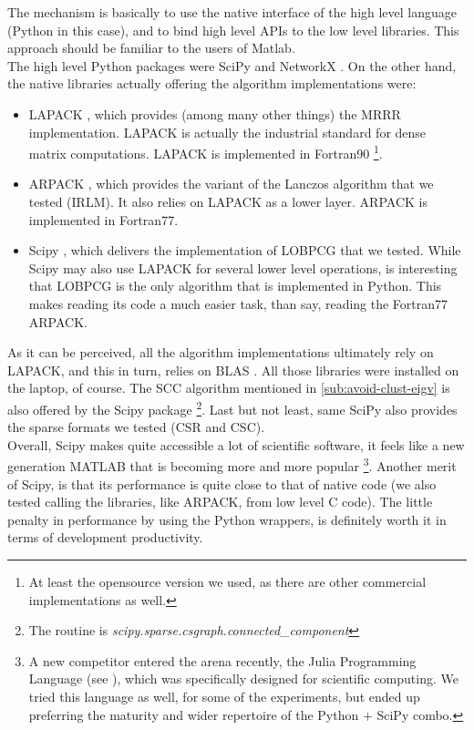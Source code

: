 The mechanism is basically to use the native interface of the high
level language (Python in this case), and to bind high level APIs to
the low level libraries. This approach should be familiar to the users
of Matlab. \\

The high level Python packages were SciPy \cite{scipy} and NetworkX
\cite{networkx}. On the other hand, the 
native libraries actually offering the algorithm implementations were:

\begin{itemize}
  \item LAPACK \cite{lapack}, which provides (among many other things)
    the \gls{MRRR} implementation. LAPACK is actually the industrial
    standard for dense matrix computations. LAPACK is implemented in
    Fortran90 \footnote{At least the opensource version we used, as
      there are other commercial implementations as well.}.

  \item ARPACK \cite{arpack}, which provides the variant of the
    Lanczos algorithm that we tested (\gls{IRLM}). It also relies on LAPACK
    as a lower layer. ARPACK is implemented in Fortran77.

  \item Scipy \cite{scipy}, which delivers the implementation of
    \gls{LOBPCG} that we tested. While Scipy may also use LAPACK for several
    lower level operations, is interesting that \gls{LOBPCG} is the only
    algorithm that is implemented in Python. This makes reading its
    code a much easier task, than say, reading the Fortran77 ARPACK. 
\end{itemize}

As it can be perceived, all the algorithm implementations ultimately
rely on LAPACK, and this in turn, relies on BLAS \cite{blas}. All
those libraries were installed on the laptop, of course. The
\gls{SCC} algorithm mentioned in \cref{sub:avoid-clust-eigv} is
also offered by the Scipy package 
\footnote{The routine is
  \emph{scipy.sparse.csgraph.connected\_component}}. Last but not 
least, same SciPy also provides the sparse formats we tested (CSR and CSC). \\

Overall, Scipy makes quite accessible a lot of scientific
software, it feels like a new generation MATLAB that is becoming more
and more popular \footnote{A new competitor entered the arena
  recently, the Julia Programming Language (see \cite{julia}), which
  was specifically
  designed for scientific computing. We tried this language as well,
  for some of the experiments, but ended up preferring the maturity
  and wider repertoire of the Python + SciPy combo.}. Another merit of Scipy,
is that its performance is quite close to that of native code (we
also tested calling the libraries, like ARPACK, from low level C
code). The little penalty in performance by using the Python wrappers,
is definitely worth it in terms of development productivity. 

